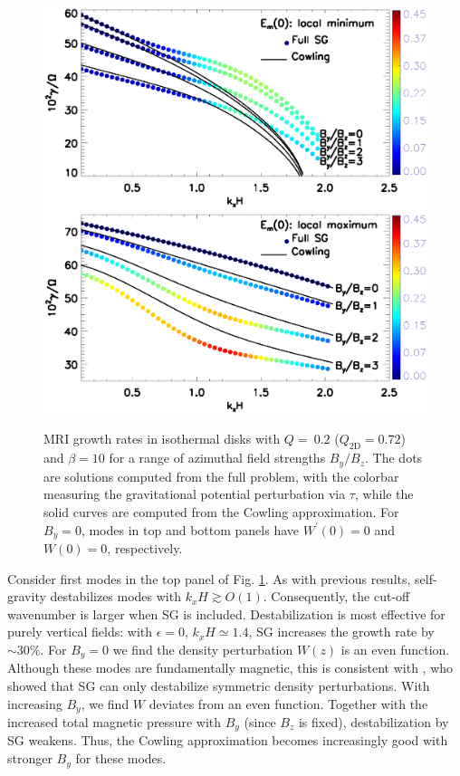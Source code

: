 \begin{figure}
  \includegraphics[width=\linewidth,clip=true,trim=0cm 2cm 0cm
    0cm]{figures/compare_growth3_tilted_even.ps}  
  \includegraphics[width=\linewidth,clip=true,trim=0cm 0cm 0cm
    0.52cm]{figures/compare_growth3_tilted_odd.ps} 
  \caption{MRI growth rates in isothermal disks with $Q=~0.2$ ($Q_\mathrm{2D}=0.72$) and 
    $\beta=10$ for a range of azimuthal field strengths $B_y/B_z$. The
    dots are solutions computed from the full problem, with the
    colorbar measuring the gravitational potential perturbation 
      via $\tau$, while
    the solid curves are computed from the Cowling approximation. 
    For $B_y=0$, modes in top and bottom panels have
    $W^\prime(0)=0$ and $W(0)=0$, respectively.
    \label{compare_growth3_tilted}}
\end{figure}


Consider first modes in the top panel of 
Fig. \ref{compare_growth3_tilted}. As with previous results,  
self-gravity destabilizes modes with  $k_xH\gtrsim O(1)$. Consequently, the
cut-off wavenumber is larger when SG is included. 
Destabilization is most effective for purely vertical fields: with
$\epsilon=0,\, k_xH\simeq 1.4$, SG increases the growth rate by $\sim
30\%$. For $B_y=0$ we find the density perturbation $W(z)$ is an even
function. Although these modes are fundamentally magnetic, this is consistent with
\cite{goldreich65a}, who showed that SG can only destabilize 
symmetric density perturbations.  
With increasing $B_y$, we find $W$ deviates from an even
function. 
Together with the increased total magnetic pressure with 
$B_y$ (since $B_z$ is fixed), destabilization by SG weakens. 
Thus, the Cowling approximation becomes increasingly good with stronger
$B_y$ for these modes. 


